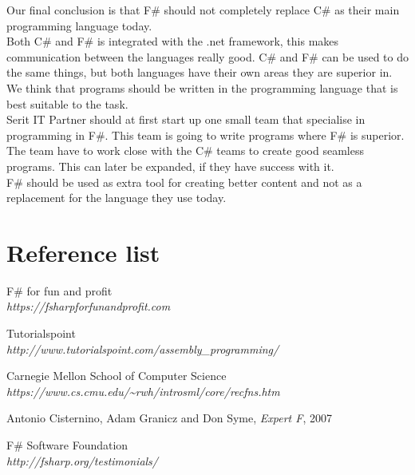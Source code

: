 \documentclass[12pt, a4paper]{article}
\begin{document}
Our final conclusion is that F\# should not completely replace C\# as their main programming language today.\\  

Both C\# and F\# is integrated with the .net framework, this makes communication between the languages really good. C\# and F\# can be used to do the same things, but both languages have their own areas they are superior in. We think that programs should be written in the programming language that is best suitable to the task.\\

Serit IT Partner should at first start up one small team that specialise in programming in F\#. This team is going to write programs where F\# is superior. The team have to work close with the C\# teams to create good seamless programs. This can later be expanded, if they have success with it.\\

F\# should be used as extra tool for creating better content and not as a replacement for the language they use today. 

\newpage

\section{Reference list}

\begin{thebibliography}{9}

F\# for fun and profit\\
\emph{https://fsharpforfunandprofit.com}

Tutorialspoint\\
\emph{http://www.tutorialspoint.com/assembly\_programming/}

Carnegie Mellon School of Computer Science\\
\emph{https://www.cs.cmu.edu/\textasciitilde rwh/introsml/core/recfns.htm}

Antonio Cisternino, Adam Granicz and Don Syme,
\textit{Expert F}, 
2007

F\# Software Foundation\\
\emph{http://fsharp.org/testimonials/}


 
\end{thebibliography}
\newpage

\appendix
\scriptsize
\end{document}

